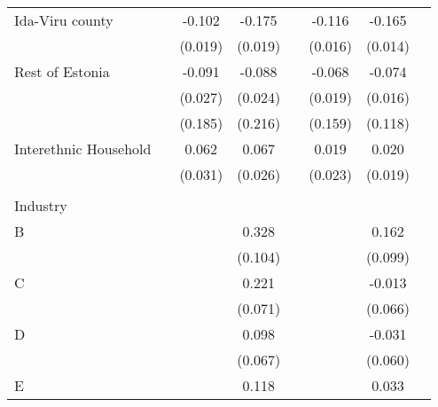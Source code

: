 \begin{longtable}{l*{3}{c}|l*{3}{c}}
Ida-Viru county           &                     &      -0.102\sym{***}&      -0.175\sym{***}&                     &      -0.116\sym{***}&      -0.165\sym{***}\\
&                     &     (0.019)         &     (0.019)         &                     &     (0.016)         &     (0.014)         \\
Rest of Estonia               &                     &      -0.091\sym{***}&      -0.088\sym{***}&                     &      -0.068\sym{***}&      -0.074\sym{***}\\
&                     &     (0.027)         &     (0.024)         &                     &     (0.019)         &     (0.016)         \\
	&                     &     (0.185)         &     (0.216)         &                     &     (0.159)         &     (0.118)         \\
	Interethnic Household&                     &       0.062\sym{**} &       0.067\sym{**} &                     &       0.019         &       0.020         \\
	&                     &     (0.031)         &     (0.026)         &                     &     (0.023)         &     (0.019)         \\
	&&&&&&&\\
	Industry &&&&&&\\
	B                   &                     &                     &       0.328\sym{***}&                     &                     &       0.162         \\
	&                     &                     &     (0.104)         &                     &                     &     (0.099)         \\
	C                   &                     &                     &       0.221\sym{***}&                     &                     &      -0.013         \\
	&                     &                     &     (0.071)         &                     &                     &     (0.066)         \\
	D                   &                     &                     &       0.098         &                     &                     &      -0.031         \\
	&                     &                     &     (0.067)         &                     &                     &     (0.060)         \\
	E                   &                     &                     &       0.118\sym{*}  &                     &                     &       0.033         \\

\end{longtable}
